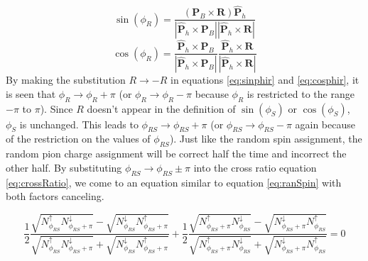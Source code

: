 \documentclass[abstract = on,listof=totoc, bibliography=totoc]{scrreprt}
\newcommand{\phirs}{\phi_{RS}}
\begin{document}
\begin{equation}
\label{eq:sinphir}
\sin(\phi_R) = \frac{(\bm{P}_B \times \bm{R})  \bm{\hat{P}}_h}{|\bm{\hat{P}}_h \times \bm{P}_B||\bm{\hat{P}}_h \times \bm{R}|}
\end{equation}
\begin{equation}
\label{eq:cosphir}
\cos(\phi_R) = \frac{\bm{\hat{P}}_h \times \bm{P}_B}{|\bm{\hat{P}}_h \times \bm{P}_B|}  \frac{\bm{\hat{P}}_h\times \bm{R}}{|\bm{\hat{P}}_h\times \bm{R}|}
\end{equation}
%
By making the substitution $R\rightarrow -R$ in equations \ref{eq:sinphir} and \ref{eq:cosphir}, it is seen that $\phi_R \rightarrow \phi_R + \pi$ (or $\phi_R \rightarrow \phi_R - \pi$ because $\phi_R$ is restricted to the range $-\pi$ to  $\pi$). Since $R$ doesn't appear in the definition of $\sin(\phi_S)$ or $\cos(\phi_S)$, $\phi_S$ is unchanged. This leads to $\phirs \rightarrow \phirs + \pi$ (or $\phirs \rightarrow \phirs - \pi$ again because of the restriction on the values of $\phirs$). Just like the random spin assignment, the random pion charge assignment will be correct half the time and incorrect the other half. By substituting $\phirs \rightarrow \phirs \pm \pi$ into the cross ratio equation \ref{eq:crossRatio}, we come to an equation similar to equation \ref{eq:ranSpin} with both factors canceling.

\begin{equation}
\label{eq:ranCharge}
\frac{1}{2}\frac{\sqrt{N^\uparrow_{\phi_{RS}}N^\downarrow_{\phi_{RS}+\pi}} - \sqrt{N^\downarrow_{\phi_{RS}}N^\uparrow_{\phi_{RS}+\pi}}}{\sqrt{N^\uparrow_{\phi_{RS}}N^\downarrow_{\phi_{RS}+\pi}} + \sqrt{N^\downarrow_{\phi_{RS}}N^\uparrow_{\phi_{RS}+\pi}}}
+
\frac{1}{2}\frac{\sqrt{N^\uparrow_{\phi_{RS}+\pi}N^\downarrow_{\phi_{RS}}} - \sqrt{N^\downarrow_{\phi_{RS}+\pi}N^\uparrow_{\phi_{RS}}}}{\sqrt{N^\uparrow_{\phi_{RS}+\pi}N^\downarrow_{\phi_{RS}}} + \sqrt{N^\downarrow_{\phi_{RS}+\pi}N^\uparrow_{\phi_{RS}}}} = 0
\end{equation}\\



 
\end{document}
